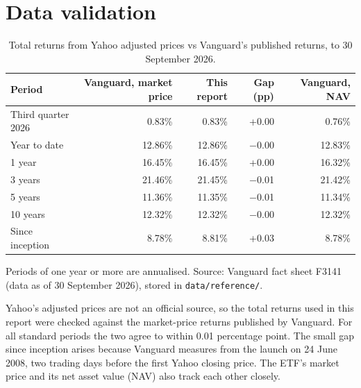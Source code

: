 \documentclass[11pt,a4paper]{article}
\newcommand{\keep}[1]{\Needspace{#1\baselineskip}}
\newcommand{\note}[1]{{\footnotesize\color{muted}#1\par}}
\begin{document}
\section{Data validation}
\begin{table}[H]
\small
\caption{Total returns from Yahoo adjusted prices vs Vanguard's published returns, to 30 September 2026.}
\begin{tabularx}{\linewidth}{L r r r r}
\toprule
\textbf{Period} & \textbf{Vanguard, market price} & \textbf{This report} & \textbf{Gap (pp)} & \textbf{Vanguard, NAV} \\
\midrule
Third quarter 2026 & 0.83\% & 0.83\% & +0.00 & 0.76\% \\
Year to date & 12.86\% & 12.86\% & $-$0.00 & 12.83\% \\
1 year & 16.45\% & 16.45\% & +0.00 & 16.32\% \\
3 years & 21.46\% & 21.45\% & $-$0.01 & 21.42\% \\
5 years & 11.36\% & 11.35\% & $-$0.01 & 11.34\% \\
10 years & 12.32\% & 12.32\% & $-$0.00 & 12.32\% \\
Since inception & 8.78\% & 8.81\% & +0.03 & 8.78\% \\
\bottomrule
\end{tabularx}
\end{table}
\note{Periods of one year or more are annualised. Source: Vanguard fact sheet F3141 (data as of 30 September 2026), stored in \texttt{data/reference/}.}

Yahoo's adjusted prices are not an official source, so the total returns used in this report were checked against the market-price returns published by Vanguard. For all standard periods the two agree to within 0.01 percentage point. The small gap since inception arises because Vanguard measures from the launch on 24 June 2008, two trading days before the first Yahoo closing price. The ETF's market price and its net asset value (NAV) also track each other closely.

\keep{20}
\end{document}
